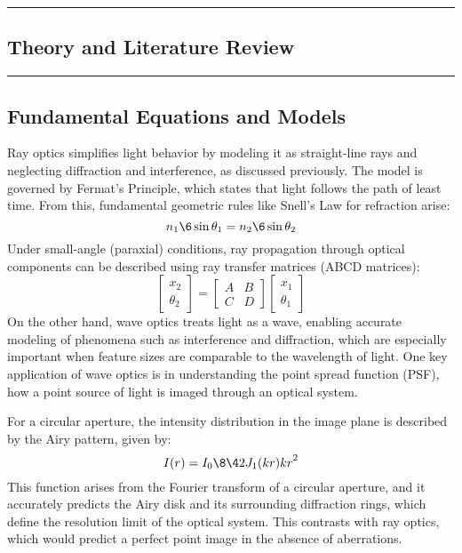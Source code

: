 {\color{gray}\hrule}
\begin{center}
\section{Theory and Literature Review}
\bigskip
\end{center}
{\color{gray}\hrule}
\begin{multicols}{2}
\subsection{Fundamental Equations and Models}
Ray optics simplifies light behavior by modeling it as straight-line rays and neglecting diffraction and interference,
as discussed previously. The model is governed by Fermat's Principle, which states that light follows the path of least time.
From this, fundamental geometric rules like Snell's Law for refraction arise: 
\[
n_1\6\sin{\theta_1} = n_2\6\sin{\theta_2}
\]
Under small-angle (paraxial) conditions, ray propagation through optical components can be described using ray transfer matrices (ABCD matrices): \[
\begin{bmatrix}
x_2 \\ \theta_2
\end{bmatrix} = \begin{bmatrix} A & B \\ C & D \end{bmatrix} \begin{bmatrix} x_1 \\ \theta_1 \end{bmatrix} 
\]
On the other hand, wave optics treats light as a wave, enabling accurate modeling of phenomena such as interference and diffraction,
which are especially important when feature sizes are comparable to the wavelength of light. 
One key application of wave optics is in understanding the point spread function (PSF), 
how a point source of light is imaged through an optical system.

For a circular aperture, the intensity distribution in the image plane is described by the Airy pattern, given by:
\begin{equation} 
I(r) = I_0\8{\4{2J_1(kr)}{kr}}^2
\end{equation}
This function arises from the Fourier transform of a circular aperture, and it accurately predicts the Airy disk and its 
surrounding diffraction rings, which define the resolution limit of the optical system. This contrasts with ray optics,
which would predict a perfect point image in the absence of aberrations.


\end{multicols}
